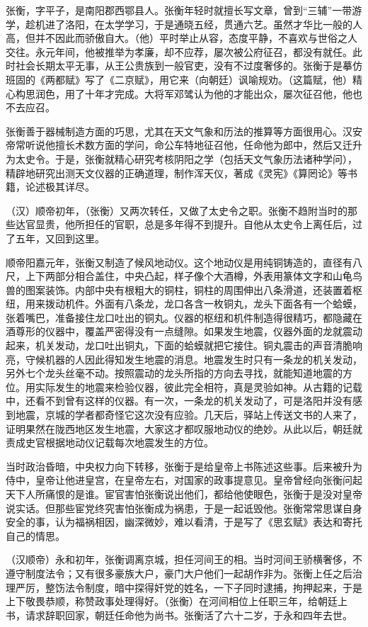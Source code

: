 \documentclass[12pt,UTF-8,openany,a4]{ctexbook}
\begin{document}
\begin{large}
    \yiwen 
    张衡，字平子，是南阳郡西鄂县人。张衡年轻时就擅长写文章，曾到“三辅”一带游学，趁机进了洛阳，在太学学习，于是通晓五经，贯通六艺。虽然才华比一般的人高，但并不因此而骄傲自大。（他）平时举止从容，态度平静，不喜欢与世俗之人交往。永元年间，他被推举为孝廉，却不应荐，屡次被公府征召，都没有就任。此时社会长期太平无事，从王公贵族到一般官吏，没有不过度奢侈的。张衡于是摹仿班固的《两都赋》写了《二京赋》，用它来（向朝廷）讽喻规劝。（这篇赋，他）精心构思润色，用了十年才完成。大将军邓骘认为他的才能出众，屡次征召他，他也不去应召。
    
    张衡善于器械制造方面的巧思，尤其在天文气象和历法的推算等方面很用心。汉安帝常听说他擅长术数方面的学问，命公车特地征召他，任命他为郎中，然后又迁升为太史令。于是，张衡就精心研究考核阴阳之学（包括天文气象历法诸种学问），精辟地研究出测天文仪器的正确道理，制作浑天仪，著成《灵宪》《算罔论》等书籍，论述极其详尽。
    
    （汉）顺帝初年，（张衡）又两次转任，又做了太史令之职。张衡不趋附当时的那些达官显贵，他所担任的官职，总是多年得不到提升。自他从太史令上离任后，过了五年，又回到这里。
    
    顺帝阳嘉元年，张衡又制造了候风地动仪。这个地动仪是用纯铜铸造的，直径有八尺，上下两部分相合盖住，中央凸起，样子像个大酒樽，外表用篆体文字和山龟鸟兽的图案装饰。内部中央有根粗大的铜柱，铜柱的周围伸出八条滑道，还装置着枢纽，用来拨动机件。外面有八条龙，龙口各含一枚铜丸，龙头下面各有一个蛤蟆，张着嘴巴，准备接住龙口吐出的铜丸。仪器的枢纽和机件制造得很精巧，都隐藏在酒尊形的仪器中，覆盖严密得没有一点缝隙。如果发生地震，仪器外面的龙就震动起来，机关发动，龙口吐出铜丸，下面的蛤蟆就把它接住。铜丸震击的声音清脆响亮，守候机器的人因此得知发生地震的消息。地震发生时只有一条龙的机关发动，另外七个龙头丝毫不动。按照震动的龙头所指的方向去寻找，就能知道地震的方位。用实际发生的地震来检验仪器，彼此完全相符，真是灵验如神。从古籍的记载中，还看不到曾有这样的仪器。有一次，一条龙的机关发动了，可是洛阳并没有感到地震，京城的学者都奇怪它这次没有应验。几天后，驿站上传送文书的人来了，证明果然在陇西地区发生地震，大家这才都叹服地动仪的绝妙。从此以后，朝廷就责成史官根据地动仪记载每次地震发生的方位。
    
    当时政治昏暗，中央权力向下转移，张衡于是给皇帝上书陈述这些事。后来被升为侍中，皇帝让他进皇宫，在皇帝左右，对国家的政事提意见。皇帝曾经向张衡问起天下人所痛恨的是谁。宦官害怕张衡说出他们，都给他使眼色，张衡于是没对皇帝说实话。但那些宦党终究害怕张衡成为祸患，于是一起诋毁他。张衡常常思谋自身安全的事，认为福祸相因，幽深微妙，难以看清，于是写了《思玄赋》表达和寄托自己的情思。
    
    （汉顺帝）永和初年，张衡调离京城，担任河间王的相。当时河间王骄横奢侈，不遵守制度法令；又有很多豪族大户，豪门大户他们一起胡作非为。张衡上任之后治理严厉，整饬法令制度，暗中探得奸党的姓名，一下子同时逮捕，拘押起来，于是上下敬畏恭顺，称赞政事处理得好。（张衡）在河间相位上任职三年，给朝廷上书，请求辞职回家，朝廷任命他为尚书。张衡活了六十二岁，于永和四年去世。
    
\end{large}
\end{document}
